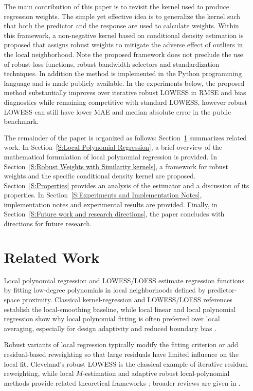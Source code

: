\documentclass[preprint,1p,times,authoryear]{elsarticle}
\begin{document}
The main contribution of this paper is to revisit the kernel used to produce regression weights. The simple yet effective idea is to generalize the kernel such that both the predictor and the response are used to calculate weights. Within this framework, a non-negative kernel based on conditional density estimation is proposed that assigns robust weights to mitigate the adverse effect of outliers in the local neighborhood. Note the proposed framework does not preclude the use of robust loss functions, robust bandwidth selectors and standardization techniques. In addition the method is implemented in the Python programming language and is made publicly available. In the experiments below, the proposed method substantially improves over iterative robust LOWESS in RMSE and bias diagnostics while remaining competitive with standard LOWESS, however robust LOWESS can still have lower MAE and median absolute error in the public benchmark.

The remainder of the paper is organized as follows: Section~\ref{S:RelatedWork} summarizes related work. In Section~\ref{S:Local Polynomial Regression}, a brief overview of the mathematical formulation of local polynomial regression is provided. In Section~\ref{S:Robust Weights with Similarity kernels}, a framework for robust weights and the specific conditional density kernel are proposed. Section~\ref{S:Properties} provides an analysis of the estimator and a discussion of its properties. In Section~\ref{S:Experiments and Implementation Notes}, implementation notes and experimental results are provided. Finally, in Section~\ref{S:Future work and research directions}, the paper concludes with directions for future research.

\section{Related Work}
\label{S:RelatedWork}

Local polynomial regression and LOWESS/LOESS estimate regression functions by fitting low-degree polynomials in local neighborhoods defined by predictor-space proximity. Classical kernel-regression and LOWESS/LOESS references establish the local-smoothing baseline, while local linear and local polynomial regression show why local polynomial fitting is often preferred over local averaging, especially for design adaptivity and reduced boundary bias \citep{Nadaraya1964OnER,Watson1964SmoothRA,cleveland79,cleveland_devlin88,Fan1993}.

Robust variants of local regression typically modify the fitting criterion or add residual-based reweighting so that large residuals have limited influence on the local fit. Cleveland's robust LOWESS is the classical example of iterative residual reweighting, while local \(M\)-estimation and adaptive robust local-polynomial methods provide related theoretical frameworks \citep{cleveland79,HardleGasser1984,ChichignoudLederer2014}; broader reviews are given in \citep{10.1002/wics.1492,SALIBIANBARRERA2023}.
\end{document}
